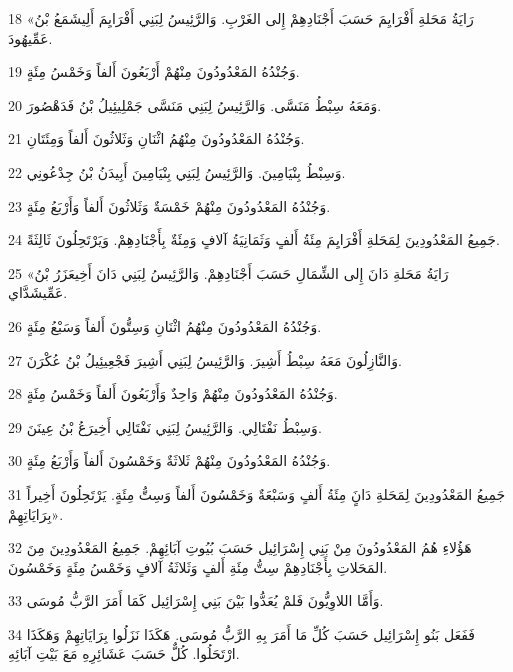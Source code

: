 \par 18 «رَايَةُ مَحَلةِ أَفْرَايِمَ حَسَبَ أَجْنَادِهِمْ إِلى الغَرْبِ. وَالرَّئِيسُ لِبَنِي أَفْرَايِمَ أَلِيشَمَعُ بْنُ عَمِّيهُودَ.
\par 19 وَجُنْدُهُ المَعْدُودُونَ مِنْهُمْ أَرْبَعُونَ أَلفاً وَخَمْسُ مِئَةٍ.
\par 20 وَمَعَهُ سِبْطُ مَنَسَّى. وَالرَّئِيسُ لِبَنِي مَنَسَّى جَمْلِيئِيلُ بْنُ فَدَهْصُورَ.
\par 21 وَجُنْدُهُ المَعْدُودُونَ مِنْهُمُ اثْنَانِ وَثَلاثُونَ أَلفاً وَمِئَتَانِ.
\par 22 وَسِبْطُ بِنْيَامِينَ. وَالرَّئِيسُ لِبَنِي بِنْيَامِينَ أَبِيدَنُ بْنُ جِدْعُونِي.
\par 23 وَجُنْدُهُ المَعْدُودُونَ مِنْهُمْ خَمْسَةٌ وَثَلاثُونَ أَلفاً وَأَرْبَعُ مِئَةٍ.
\par 24 جَمِيعُ المَعْدُودِينَ لِمَحَلةِ أَفْرَايِمَ مِئَةُ أَلفٍ وَثَمَانِيَةُ آلافٍ وَمِئَةٌ بِأَجْنَادِهِمْ. وَيَرْتَحِلُونَ ثَالِثَةً.
\par 25 «رَايَةُ مَحَلةِ دَانَ إِلى الشِّمَالِ حَسَبَ أَجْنَادِهِمْ. وَالرَّئِيسُ لِبَنِي دَانَ أَخِيعَزَرُ بْنُ عَمِّيشَدَّاي.
\par 26 وَجُنْدُهُ المَعْدُودُونَ مِنْهُمُ اثْنَانِ وَسِتُّونَ أَلفاً وَسَبْعُ مِئَةٍ.
\par 27 وَالنَّازِلُونَ مَعَهُ سِبْطُ أَشِيرَ. وَالرَّئِيسُ لِبَنِي أَشِيرَ فَجْعِيئِيلُ بْنُ عُكْرَنَ.
\par 28 وَجُنْدُهُ المَعْدُودُونَ مِنْهُمْ وَاحِدٌ وَأَرْبَعُونَ أَلفاً وَخَمْسُ مِئَةٍ.
\par 29 وَسِبْطُ نَفْتَالِي. وَالرَّئِيسُ لِبَنِي نَفْتَالِي أَخِيرَعُ بْنُ عِينَنَ.
\par 30 وَجُنْدُهُ المَعْدُودُونَ مِنْهُمْ ثَلاثَةٌ وَخَمْسُونَ أَلفاً وَأَرْبَعُ مِئَةٍ.
\par 31 جَمِيعُ المَعْدُودِينَ لِمَحَلةِ دَانٍَ مِئَةُ أَلفٍ وَسَبْعَةٌ وَخَمْسُونَ أَلفاً وَسِتُّ مِئَةٍ. يَرْتَحِلُونَ أَخِيراً بِرَايَاتِهِمْ».
\par 32 هَؤُلاءِ هُمُ المَعْدُودُونَ مِنْ بَنِي إِسْرَائِيل حَسَبَ بُيُوتِ آبَائِهِمْ. جَمِيعُ المَعْدُودِينَ مِنَ المَحَلاتِ بِأَجْنَادِهِمْ سِتُّ مِئَةِ أَلفٍ وَثَلاثَةُ آلافٍ وَخَمْسُ مِئَةٍ وَخَمْسُونَ.
\par 33 وَأَمَّا اللاوِيُّونَ فَلمْ يُعَدُّوا بَيْنَ بَنِي إِسْرَائِيل كَمَا أَمَرَ الرَّبُّ مُوسَى.
\par 34 فَفَعَل بَنُو إِسْرَائِيل حَسَبَ كُلِّ مَا أَمَرَ بِهِ الرَّبُّ مُوسَى. هَكَذَا نَزَلُوا بِرَايَاتِهِمْ وَهَكَذَا ارْتَحَلُوا. كُلٌّ حَسَبَ عَشَائِرِهِ مَعَ بَيْتِ آبَائِهِ.

